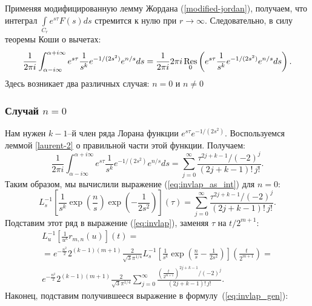 \documentclass[../paper.tex]{subfiles}
\begin{document}
Применяя модифицированную лемму Жордана (\ref{modified-jordan}), получаем, что интеграл $\int\limits_{C_r} e^{s\tau} F(s)ds$ стремится к нулю при $r \to \infty$.
Следовательно, в силу теоремы Коши о вычетах:
\[
    \frac{1}{2\pi i}\int_{\alpha-i\infty}^{\alpha+i\infty} e^{s\tau} \frac{1}{s^k} e^{-1/(2s^2)} e^{n/s} ds =
    \frac{1}{2\pi i} 2\pi i \operatorname*{Res}_0 \left( e^{s\tau} \frac{1}{s^k} e^{-1/(2s^2)} e^{n/s} ds \right)
.\]
Здесь возникает два различных случая: $n=0$ и $n\neq$0

\subsubsection{Случай $n = 0$}
Нам нужен $k-1$--й член ряда Лорана функции $e^{s\tau} e^{-1/(2s^2)}$. Воспользуемся леммой \ref{laurent-2} о правильной части этой функции.  Получаем:
\[
    \frac{1}{2\pi i}\int_{\alpha-i\infty}^{\alpha+i\infty} e^{s\tau} \frac{1}{s^k} e^{-1/(2s^2)} e^{n/s} ds =
    \sum_{j=0}^{\infty} \frac{\tau^{2j+k-1} / (-2)^j}{(2j+k-1)!\,j!}
.\]
Таким образом, мы вычислили выражение (\ref{eq:invlap_as_int}) для $n = 0$:
\[
    L^{-1}_s \left[ \frac{1}{s^k}
    \exp \left(\frac{n}{s}\right)
    \exp \left(-\frac{1}{2 s^2 }\right)
    \right] \left( \tau \right)
=
    \sum_{j=0}^{\infty} \frac{\tau^{2j+k-1} / (-2)^j}{(2j+k-1)!\,j!}
.\]
Подставим этот ряд в выражение (\ref{eq:invlap}), заменяя $\tau$ на $t/2^{m+1}$:
\begin{multline*}
    L^{-1}_u \left[ \frac{1}{u^k} r_{m,n}(u) \right](t)
=\\=%
    e^{-\frac{n^2}{2}} 2^{(k-1)(m+1)} \frac{2}{\sqrt{3} \pi^{1/4}}
    L^{-1}_s \left[ \frac{1}{s^k}
    \exp \left(\frac{n}{s} - \frac{1}{2 s^2 }
    \right)
    \right] \left( \frac{t}{2^{m+1}} \right) =
\\%
    e^{-\frac{n^2}{2}} 2^{(k-1)(m+1)} \frac{2}{\sqrt{3} \pi^{1/4}}
    \sum_{j=0}^{\infty} \frac{\left(\frac{t}{2^{m+1}}\right)^{2j+k-1} / (-2)^j}{(2j+k-1)!\,j!}
.\end{multline*}
Наконец, подставим получившееся выражение в формулу~(\ref{eq:invlap_gen}):
\end{document}
